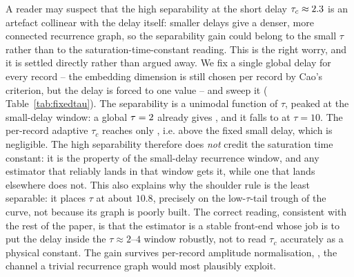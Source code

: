 \documentclass[10pt,a4paper,twocolumn]{article}
\begin{document}
A reader may suspect that the high separability at the short delay
$\tau_c\approx2.3$ is an artefact collinear with the delay itself:
smaller delays give a denser, more connected recurrence graph, so the
separability gain could belong to the small $\tau$ rather than to the
saturation-time-constant reading.  This is the right worry, and it is settled
directly rather than argued away.  We fix a single global delay for every
record -- the embedding dimension is still chosen per record by Cao's
criterion, but the delay is forced to one value -- and sweep it (
Table~\ref{tab:fixedtau}).  The separability is a unimodal function of $\tau$,
peaked at the small-delay window: a global $\tau=2$ already gives
\sepFixTwo, and it falls to \sepFixTen{} at $\tau=10$.  The per-record
adaptive $\tau_c$ reaches only \sepAdaptive, i.e. \sepAdaptiveGain{} above the
fixed small delay, which is negligible.  The high separability therefore does
\emph{not} credit the saturation time constant: it is the property of the
small-delay recurrence window, and any estimator that reliably lands in that
window gets it, while one that lands elsewhere does not.  This also explains
why the shoulder rule is the least separable: it places $\tau$ at about
$10.8$, precisely on the low-$\tau$-tail trough of the curve, not because its
graph is poorly built.  The correct reading, consistent with the rest of the
paper, is that the estimator is a stable front-end whose job is to put the
delay inside the $\tau\approx2$--$4$ window robustly, not to read $\tau_c$
accurately as a physical constant.  The gain survives per-record amplitude
normalisation, \sepNormFIT{}, the channel a trivial recurrence graph would
most plausibly exploit.

\begin{table}[t]
\centering
\caption{The delay scale against the descriptor.  ``sep.'' is the hypergraph
separability on the full $180$-record set; the normalised column repeats it
after per-record amplitude normalisation, removing the amplitude channel; the
last column is the separability under $10$~dB additive noise (n-per-class
$=12$, three seeds).}
\label{tab:delayscale}
\scriptsize

\end{table}

\begin{table}[t]
\centering
\caption{De-collinearising the delay: one global delay forced on every record,
the embedding dimension still chosen per record by Cao's criterion.  The
separability is a unimodal function of $\tau$ peaked at the small-delay window;
a fixed $\tau=2$ already reaches the peak, so the per-record adaptive
$\tau_c$ (bottom row) adds only \sepAdaptiveGain{}.}
\label{tab:fixedtau}
\scriptsize

\end{table}
\end{document}
